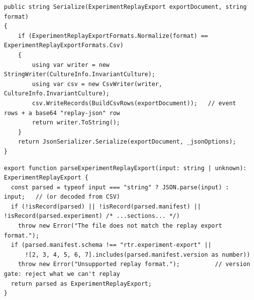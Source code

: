 \begin{listing}[htbp]
\begin{verbatim}
public string Serialize(ExperimentReplayExport exportDocument, string format)
{
    if (ExperimentReplayExportFormats.Normalize(format) == ExperimentReplayExportFormats.Csv)
    {
        using var writer = new StringWriter(CultureInfo.InvariantCulture);
        using var csv = new CsvWriter(writer, CultureInfo.InvariantCulture);
        csv.WriteRecords(BuildCsvRows(exportDocument));   // event rows + a base64 "replay-json" row
        return writer.ToString();
    }
    return JsonSerializer.Serialize(exportDocument, _jsonOptions);
}
\end{verbatim}
\caption{Dual-format export (abbreviated from \texttt{ExperimentReplayExportSerializer.cs}): per-event CSV rows plus one base64-encoded JSON row, keeping the file fully replayable.}
\label{lst:impl-export}
\end{listing}

\begin{listing}[htbp]
\begin{verbatim}
export function parseExperimentReplayExport(input: string | unknown): ExperimentReplayExport {
  const parsed = typeof input === "string" ? JSON.parse(input) : input;   // (or decoded from CSV)
  if (!isRecord(parsed) || !isRecord(parsed.manifest) || !isRecord(parsed.experiment) /* ...sections... */)
    throw new Error("The file does not match the replay export format.");
  if (parsed.manifest.schema !== "rtr.experiment-export" ||
      ![2, 3, 4, 5, 6, 7].includes(parsed.manifest.version as number))
    throw new Error("Unsupported replay format.");          // version gate: reject what we can't replay
  return parsed as ExperimentReplayExport;
}
\end{verbatim}
\caption{Version-gated import (abbreviated from \texttt{experiment-replay.ts}): structure, schema, and version validated before reconstruction; unsupported versions are rejected rather than mis-rendered.}
\label{lst:impl-import}
\end{listing}
\FloatBarrier
